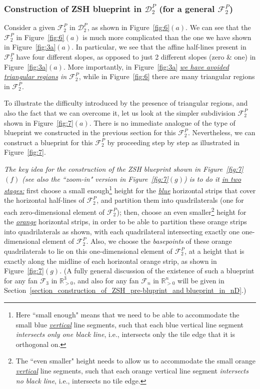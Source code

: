 \documentclass[12pt,letterpaper]{article}
\newcommand{\RRp}{\mathbb{R}_{>0}}
\begin{document}
\subsubsection{Construction of ZSH blueprint in $\mathscr{D}_2^P$ (for a general $\mathcal{F}_2^P$)}

Consider a given $\mathcal{F}_2^P$ in $\mathscr{D}_2^P$, as shown in Figure~\ref{fig:6}$(a)$. We can see that the $\mathcal{F}_2^P$ in Figure~\ref{fig:6}$(a)$ is much more complicated than the one we have shown in Figure~\ref{fig:3a}$(a)$. 
In particular, we see that the affine half-lines present in $\mathcal{F}_2^P$ have four different slopes, as opposed to just 2 different slopes (zero \& one) in Figure~\ref{fig:3a}$(a)$. 
More importantly, in Figure~\ref{fig:3a} {\em \ul{we have avoided triangular regions} in $\mathcal{F}_2^P$}, while in Figure~\ref{fig:6} there are many triangular regions in $\mathcal{F}_2^P$. 

To illustrate the difficulty introduced by the presence of triangular regions, and also the fact that we can overcome it, let us look at the simpler subdivision $\mathcal{F}_2^P$ shown in Figure~\ref{fig:7}$(a)$. There is no immediate analogue of the type of blueprint we constructed in the previous section for this $\mathcal{F}_2^P$. Nevertheless, we can construct a blueprint for this $\mathcal{F}_2^P$ by proceeding step by step as illustrated in Figure~\ref{fig:7}.

{\em The key idea for the construction of the ZSH blueprint shown in Figure~\ref{fig:7}$(f)$ (see also the ``zoom-in" version in Figure~\ref{fig:7}$(g)$) is to do it \ul{in two stages:}} first choose a small enough\footnote{Here ``small enough" means that we need to be able to accommodate the small blue \underline{\em vertical} line segments, such that each blue vertical line segment {\em intersects only one black line}, i.e.,  intersects only the tile edge that it is  orthogonal on.} height for the \underline{\em blue} horizontal strips that cover the horizontal half-lines of $\mathcal{F}_2^P$, and partition them into quadrilaterals (one for each zero-dimensional element of $\mathcal{F}_2^P$); then, choose an even smaller\footnote{The ``even smaller" height needs to allow us to accommodate the small orange \underline{\em vertical} line segments, such that each orange vertical line segment {\em intersects no black line}, i.e.,  intersects no tile edge.} height for the \underline{\em orange} horizontal strips, in order to be able to partition these orange strips into quadrilaterals as shown, with each quadrilateral intersecting exactly one one-dimensional element of $\mathcal{F}_2^P$. Also, we choose the {\em basepoints} of these orange quadrilaterals to lie on this one-dimensional element of $\mathcal{F}_2^P$, at a height that is exactly along the midline of each horizontal orange strip, as shown in Figure~\ref{fig:7}$(g)$. (A fully general discussion of the existence of such a blueprint for any fan $\mathcal{F}_3$ in $\RRp^3$, and also for any fan $\mathcal{F}_n$ in $\RRp^n$ will be given in Section~\ref{section_construction_of_ZSH_pre-bluprint_and blueprint_in_nD}.)
\end{document}
